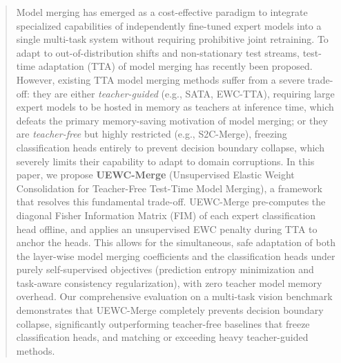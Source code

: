 \documentclass{article}
\theoremstyle{plain}
\theoremstyle{definition}
\theoremstyle{remark}
\begin{document}
\printAffiliationsAndNotice{}  %

\begin{abstract}
  Model merging has emerged as a cost-effective paradigm to integrate specialized capabilities of independently fine-tuned expert models into a single multi-task system without requiring prohibitive joint retraining. To adapt to out-of-distribution shifts and non-stationary test streams, test-time adaptation (TTA) of model merging has recently been proposed. However, existing TTA model merging methods suffer from a severe trade-off: they are either \textit{teacher-guided} (e.g., SATA, EWC-TTA), requiring large expert models to be hosted in memory as teachers at inference time, which defeats the primary memory-saving motivation of model merging; or they are \textit{teacher-free} but highly restricted (e.g., S2C-Merge), freezing classification heads entirely to prevent decision boundary collapse, which severely limits their capability to adapt to domain corruptions. In this paper, we propose \textbf{UEWC-Merge} (Unsupervised Elastic Weight Consolidation for Teacher-Free Test-Time Model Merging), a framework that resolves this fundamental trade-off. UEWC-Merge pre-computes the diagonal Fisher Information Matrix (FIM) of each expert classification head offline, and applies an unsupervised EWC penalty during TTA to anchor the heads. This allows for the simultaneous, safe adaptation of both the layer-wise model merging coefficients and the classification heads under purely self-supervised objectives (prediction entropy minimization and task-aware consistency regularization), with zero teacher model memory overhead. Our comprehensive evaluation on a multi-task vision benchmark demonstrates that UEWC-Merge completely prevents decision boundary collapse, significantly outperforming teacher-free baselines that freeze classification heads, and matching or exceeding heavy teacher-guided methods.
\end{abstract}
\end{document}
